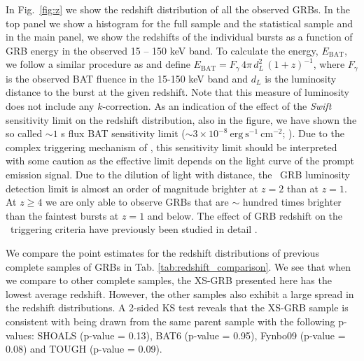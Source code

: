 \documentclass{aa}    %
\begin{document}
In Fig.~\ref{fig:z} we show the redshift distribution of all  the observed GRBs.
In the top panel we show a histogram for the full sample and the statistical
sample and in the main panel, we show the redshifts of the individual bursts as
a function of GRB energy in the observed 15 -- 150 keV band. To calculate the
energy, $E_{\mathrm{BAT}}$, we follow a similar procedure as \citet{Lien2016}
and define $E_{\mathrm{BAT}} = F_{\gamma}\,4 \pi\,d_L^2\,(1+z)^{-1}$, where
$F_{\gamma}$ is the observed BAT fluence in the 15-150 keV band and $d_L$ is the
luminosity distance to the burst at the given redshift. Note that this measure
of luminosity does not include any $k$-correction. As an indication of the
effect of the \textit{Swift} sensitivity limit on the redshift distribution,
also in the figure, we have shown the so called $\sim 1$ s flux BAT sensitivity
limit ($\sim 3 \times 10^{-8}~\mathrm{erg}~\mathrm{s}^{-1}~\mathrm{cm}^{-2}$;
\citealt{Baumgartner2013, Lien2016}). Due to the complex triggering mechanism of
\swift, this sensitivity limit should be interpreted with some caution as the
effective limit depends on the light curve of the prompt emission signal. Due to
the dilution of light with distance, the \swift~GRB luminosity detection limit
is almost an order of magnitude brighter at $z=2$ than at $z=1$. At $z\geq4$ we
are only able to observe GRBs that are $\sim$ hundred times brighter than the
faintest bursts at $z=1$ and below. The effect of GRB redshift on the \swift~triggering criteria have previously been studied in detail \citep{Littlejohns2013a}.

We compare the point estimates for the redshift distributions of previous
complete samples of GRBs in Tab. \ref{tab:redshift_comparison}. We see that when
we compare to other complete samples, the XS-GRB presented here has the lowest
average redshift. However, the other samples also exhibit a large spread in the
redshift distributions. A 2-sided KS test reveals that the XS-GRB sample is consistent with
being drawn from the same parent sample with the following p-values: SHOALS (p-value = 0.13), BAT6 (p-value = 0.95), Fynbo09 (p-value = 0.08) and TOUGH (p-value = 0.09).
\end{document}
